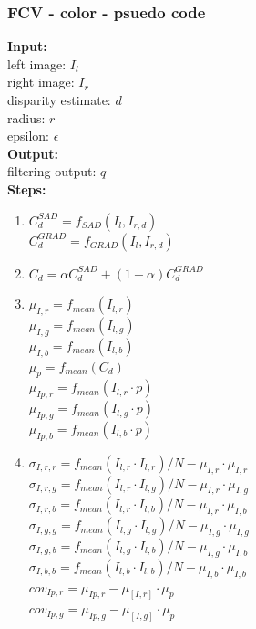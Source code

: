 \subsubsection*{FCV - color - psuedo code}
\textbf{Input:} \\
left image: $I_l$\\
right image: $I_r$\\
disparity estimate: $d$\\
radius: $r$\\
epsilon: $\epsilon$\\
\textbf{Output:} \\
filtering output: $q$\\
\textbf{Steps:}
\begin{enumerate}
  \item $C^{SAD}_d = f_{SAD}(I_l,I_{r,d})$\\
           $C^{GRAD}_d = f_{GRAD}(I_l,I_{r,d})$
  \item $C_d = \alpha C^{SAD}_d + (1-\alpha) C^{GRAD}_d$
  \item $\mu_{I,r} = f_{mean}(I_{l,r})$ \\
           $\mu_{I,g} = f_{mean}(I_{l,g})$ \\
           $\mu_{I,b} = f_{mean}(I_{l,b})$ \\
           $\mu_p = f_{mean}(C_d)$ \\
           $\mu_{Ip,r} = f_{mean}(I_{l,r}\cdot p)$ \\
           $\mu_{Ip,g} = f_{mean}(I_{l,g}\cdot p)$ \\
           $\mu_{Ip,b} = f_{mean}(I_{l,b}\cdot p)$
  \item $\sigma_{I,r,r} = f_{mean}(I_{l,r}\cdot I_{l,r}) / N - \mu_{I,r} \cdot \mu_{I,r}$\\
           $\sigma_{I,r,g} = f_{mean}(I_{l,r}\cdot I_{l,g}) / N - \mu_{I,r} \cdot \mu_{I,g}$\\
           $\sigma_{I,r,b} = f_{mean}(I_{l,r}\cdot I_{l,b}) / N - \mu_{I,r} \cdot \mu_{I,b}$\\
           $\sigma_{I,g,g} = f_{mean}(I_{l,g}\cdot I_{l,g}) / N - \mu_{I,g} \cdot \mu_{I,g}$\\
           $\sigma_{I,g,b} = f_{mean}(I_{l,g}\cdot I_{l,b}) / N - \mu_{I,g} \cdot \mu_{I,b}$\\
           $\sigma_{I,b,b} = f_{mean}(I_{l,b}\cdot I_{l,b}) / N - \mu_{I,b} \cdot \mu_{I,b}$\\
           $cov_{Ip,r} = \mu_{Ip,r} - \mu_[I,r] \cdot \mu_p$\\
           $cov_{Ip,g} = \mu_{Ip,g} - \mu_[I,g] \cdot \mu_p$\\

\end{enumerate}
